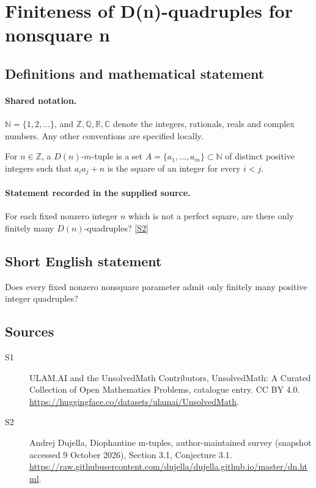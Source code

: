 \documentclass[11pt]{article}
\newcommand{\sref}[2]{\hyperlink{source:#1:#2}{[S#2]}}
\begin{document}
\section{Finiteness of D(n)-quadruples for nonsquare n}\label{statement}

\subsection{Definitions and mathematical statement}

\paragraph{Shared notation.}$\mathbb N=\{1,2,\ldots\}$, and $\mathbb Z,\mathbb Q,\mathbb R,\mathbb C$ denote the integers, rationals, reals and complex numbers. Any other conventions are specified locally.


For $n\in\mathbb Z$, a $D(n)$-$m$-tuple is a set $A=\{a_1,\ldots,a_m\}\subset\mathbb N$ of distinct positive integers such that $a_i a_j+n$ is the square of an integer for every $i<j$.
\paragraph{Statement recorded in the supplied source.}
For each fixed nonzero integer $n$ which is not a perfect square, are there only finitely many $D(n)$-quadruples? \sref{statement}{2}
\subsection{Short English statement}
Does every fixed nonzero nonsquare parameter admit only finitely many positive integer quadruples?
\subsection{Sources}
\begin{description}
\item[\hypertarget{source:statement:1}{S1}] ULAM.AI and the UnsolvedMath Contributors, UnsolvedMath: A Curated Collection of Open Mathematics Problems, catalogue entry. CC BY 4.0. \url{https://huggingface.co/datasets/ulamai/UnsolvedMath}.
\item[\hypertarget{source:statement:2}{S2}] Andrej Dujella, Diophantine m-tuples, author-maintained survey (snapshot accessed 9 October 2026), Section 3.1, Conjecture 3.1. \url{https://raw.githubusercontent.com/dujella/dujella.github.io/master/dn.html}.
\end{description}
\label{end:statement}
\end{document}
